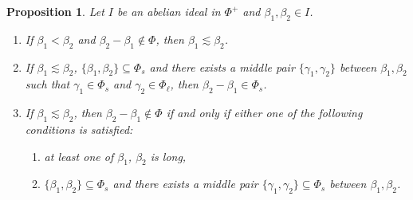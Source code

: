 \documentclass[10pt]{amsart}
\newtheorem{pro}[thm]{Proposition}
\theoremstyle{definition}
\theoremstyle{remark}
\newcommand\be{\beta}
\newcommand\ga{\gamma}
\begin{document}
\begin{pro}\label{pro:minori-crossing}
Let $I$ be an abelian ideal in $\Phi^+$ and $\be_1, \be_2\in I$. 
\begin{enumerate}
\item 
If $\be_1<\be_2$ and $\be_2-\be_1\not\in\Phi$, then $\be_1\lesssim\be_2$.
\label{itm:nonroot-then-sim}
\item 
If $\be_1\lesssim\be_2$, $\{\be_1, \be_2\}\subseteq\Phi_s$ and there exists a middle pair $\{\ga_1, \ga_2\}$ between $\be_1, \be_2$ such that $\ga_1\in\Phi_s$ and $\ga_2\in\Phi_\ell$, then $\be_2-\be_1\in\Phi_s$.
\label{itm:sim-then-root}
\item
If $\be_1\lesssim\be_2$, then  $\be_2-\be_1\not\in\Phi$ if and only if either one of the following conditions is satisfied:
\begin{enumerate}[label=\textup{(\alph*)}]
\item at least one of $\be_1$, $\be_2$ is long,
\item $\{\be_1, \be_2\}\subseteq\Phi_s$ and there exists  a middle pair $\{\ga_1, \ga_2\}\subseteq\Phi_s$ between $\be_1, \be_2$.
\end{enumerate}
\label{itm:sim-then-nonroot}
\end{enumerate}
\end{pro}
\end{document}
